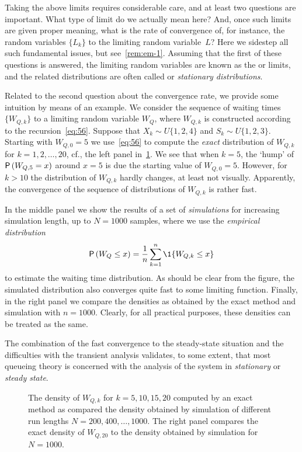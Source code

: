 Taking the above limits requires considerable care, and at least two questions are important.
What type of limit do we actually mean here?
And, once such limits are given proper meaning, what is the rate of convergence of, for instance, the random variables $\{L_k\}$ to the limiting random variable~$L$?
Here we sidestep all such fundamental issues, but see~\cref{rem:em-1}.
Assuming that the first of these questions is answered, the limiting random variables are known as the  or  limits, and the related distributions are often called  or \emph{stationary distributions}.

Related to the second question about the convergence rate, we provide some intuition by means of an example.
We consider the sequence of waiting times $\{W_{Q,k}\}$ to a limiting random variable $W_Q$, where $W_{Q,k}$ is constructed according to the recursion~\cref{eq:56}.
Suppose that $X_k\sim U\{1,2,4\}$ and $S_k\sim U\{1,2,3\}$.
Starting with $W_{Q,0}=5$ we use~\cref{eq:56} to compute the \emph{exact} distribution of $W_{Q,k}$ for $k=1,2,\ldots, 20$, cf., the left panel in~\cref{fig:convergence}.
We see that when $k=5$, the `hump' of $\P{W_{Q,5}=x}$ around $x=5$ is due the starting value of $W_{Q,0}=5$.
However, for $k>10$ the distribution of $W_{Q,k}$ hardly changes, at least not visually.
Apparently, the convergence of the sequence of distributions of $W_{Q,k}$ is rather fast.

In the middle panel we show the results of a set of \emph{simulations} for increasing simulation length, up to $N=1000$ samples, where we use the \emph{empirical distribution} 
\begin{equation*}
\P{W_Q\leq x} = \frac 1n \sum_{k=1}^n \1{W_{Q,k} \leq x}
\end{equation*}
to estimate the waiting time distribution. 
As should be clear from the figure, the simulated distribution also converges quite fast to some limiting function.
Finally, in the right panel we compare the densities as obtained by the exact method and simulation with $n=1000$.
Clearly, for all practical purposes, these densities can be treated as the same.


The combination of the fast convergence to the steady-state situation and the difficulties with the transient analysis validates, to some extent, that most queueing theory is concerned with the analysis of the system in \emph{stationary} or \emph{steady state}.

\begin{figure}
 \centering



 \caption{The density of $W_{Q,k}$ for $k=5, 10, 15, 20$ computed by
 an exact method as compared the density obtained by simulation of
 different run lengths $N=200, 400, \ldots, 1000$. The right panel
 compares the exact density of $W_{Q,20}$ to the density obtained by simulation
 for $N=1000$.}
\label{fig:convergence}
\end{figure}




